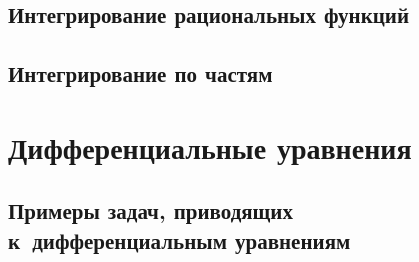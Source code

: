 \documentclass[14pt, oneside]{extbook}
\begin{document}
\section{Интегрирование рациональных функций}

\section{Интегрирование по частям}



\chapter{Дифференциальные уравнения}

\section{Примеры задач, приводящих к~дифференциальным уравнениям}

\end{document}
